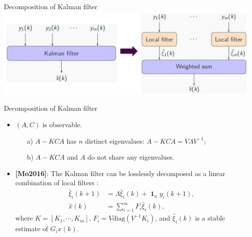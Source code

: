 \documentclass[10pt]{beamer}
\newcommand{\diag}{\text{diag}}
\DeclareMathOperator{\1}{\textbf{1}}
\begin{document}
\begin{frame}{Decomposition of Kalman filter}
	\centering
\includegraphics[width=1.0\textwidth]{pic/decomp}
\end{frame}

\begin{frame}{Decomposition of Kalman filter}
	\begin{itemize}
		\item $(A,C)$ is observable.
		\begin{itemize}
			\item[a)] $A-KCA$ has {\color{thupurple} $n$ distinct} eigenvalues: $A-KCA=V\Lambda V^{-1}$;
			\item[b)] $A-KCA$ and $A$ {\color{thupurple}do not share} any eigenvalues.
		\end{itemize}
		\item {\textbf{[Mo2016]}}:
		The Kalman filter can be losslessly decomposed as a linear combination of local filters :
		\begin{align*}
		\hat \xi_i(k+1)&=\Lambda\hat \xi_i(k)+\1_ny_i(k+1),\\
		\hat x(k)&=\sum_{i=1}^m F_i\hat \xi_i(k),
		\end{align*}
		where $K=[K_1,\cdots,K_m]$, $F_i=V \diag(V^{-1}K_i)$, and {\color{thupurple}$\hat\xi_i(k)$ is a stable estimate of $G_ix(k)$}. 
	\end{itemize}
\end{frame}
\end{document}
